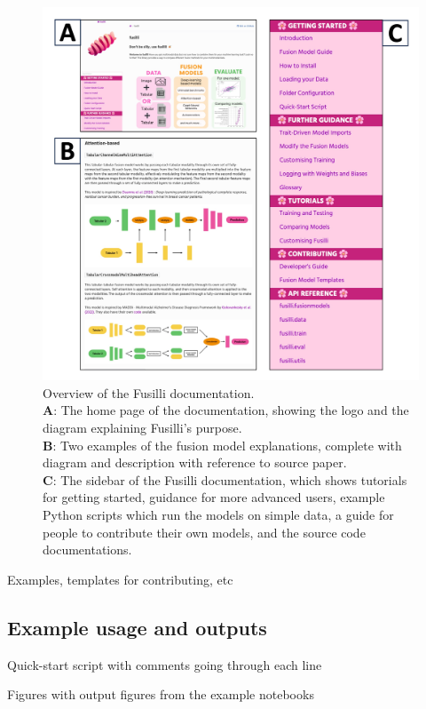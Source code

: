 \begin{figure}
    \centering
    \includegraphics[width=1\linewidth]{figures/fusilli_documentation.jpg}
    \caption{Overview of the Fusilli documentation. \\
    \textbf{A}: The home page of the documentation, showing the logo and the diagram explaining Fusilli's purpose.\\
    \textbf{B}: Two examples of the fusion model explanations, complete with diagram and description with reference to source paper. \\
    \textbf{C}: The sidebar of the Fusilli documentation, which shows tutorials for getting started, guidance for more advanced users, example Python scripts which run the models on simple data, a guide for people to contribute their own models, and the source code documentations.
    }
    \label{fig:fusillidocs}
\end{figure}

Examples, templates for contributing, etc


\subsection{Example usage and outputs}
Quick-start script with comments going through each line

Figures with output figures from the example notebooks

